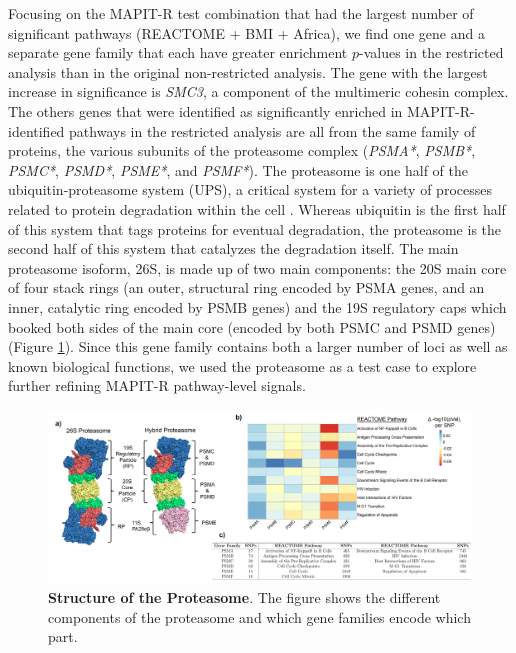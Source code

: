 \documentclass[12pt,a4paper]{article}
\begin{document}
Focusing on the MAPIT-R test combination that had the largest number of significant pathways (REACTOME + BMI + Africa), we find one gene and a separate gene family that each have greater enrichment $p$-values in the restricted analysis than in the original non-restricted analysis. The gene with the largest increase in significance is {\emph{SMC3}}, a component of the multimeric cohesin complex. The others genes that were identified as significantly enriched in MAPIT-R-identified pathways in the restricted analysis are all from the same family of proteins, the various subunits of the proteasome complex ({\emph{PSMA*}}, {\emph{PSMB*}}, {\emph{PSMC*}}, {\emph{PSMD*}}, {\emph{PSME*}}, and {\emph{PSMF*}}). The proteasome is one half of the ubiquitin-proteasome system (UPS), a critical system for a variety of processes related to protein degradation within the cell \citep{Voges1999,Livneh2016,Collins2017}. Whereas ubiquitin is the first half of this system that tags proteins for eventual degradation, the proteasome is the second half of this system that catalyzes the degradation itself. The main proteasome isoform, 26S, is made up of two main components: the 20S main core of four stack rings (an outer, structural ring encoded by PSMA genes, and an inner, catalytic ring encoded by PSMB genes) and the 19S regulatory caps which booked both sides of the main core (encoded by both PSMC and PSMD genes) (Figure \ref{InterPath-Main-Figure-Proteasome-Schematic}). Since this gene family contains both a larger number of loci as well as known biological functions, we used the proteasome as a test case to explore further refining MAPIT-R pathway-level signals.

\begin{figure}[htb]
\centering
\hspace*{-1cm}
\includegraphics[scale=.45]{Images/Main/InterPath_Main_Figure_Proteasome_vs2.png}
\caption[TBD]{\textbf{Structure of the Proteasome}. The figure shows the different components of the proteasome and which gene families encode which part.
}
\label{InterPath-Main-Figure-Proteasome-Schematic}
\end{figure}
\end{document}

